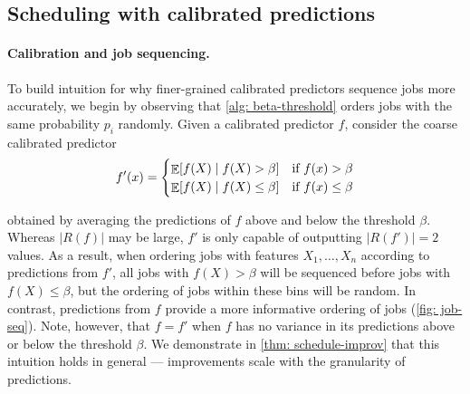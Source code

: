 \subsection{Scheduling with calibrated predictions}
\paragraph{Calibration and job sequencing.} To build intuition for why finer-grained calibrated predictors sequence jobs more accurately, we begin by observing that \cref{alg: beta-threshold} orders jobs with the same probability $p_i$ randomly. Given a calibrated predictor $f$, consider the coarse calibrated predictor
\[
    f'(x) = \begin{cases}\mathop{\mathbb{E}}[f(X) \mid f(X) > \beta] & \text{if $f(x) > \beta$} \\
    \mathop{\mathbb{E}}[f(X) \mid f(X) \leq \beta] &\text{if $f(x) \leq \beta$}\end{cases}
\]

obtained by averaging the predictions of $f$ above and below the threshold $\beta$. Whereas $|R(f)|$ may be large, $f'$ is only capable of outputting $|R(f')|=2$ values. As a result, when ordering jobs with features $X_1, \dots, X_n$ according to predictions from $f'$, all jobs with $f(X) > \beta$ will be sequenced before jobs with $f(X) \leq \beta$, but the ordering of jobs within these bins will be random. In contrast, predictions from $f$ provide a more informative ordering of jobs (\cref{fig: job-seq}). Note, however, that $f = f'$ when $f$ has no variance in its predictions above or below the threshold $\beta$. We demonstrate in \cref{thm: schedule-improv} that this intuition holds in general --- improvements scale with the granularity of predictions.

